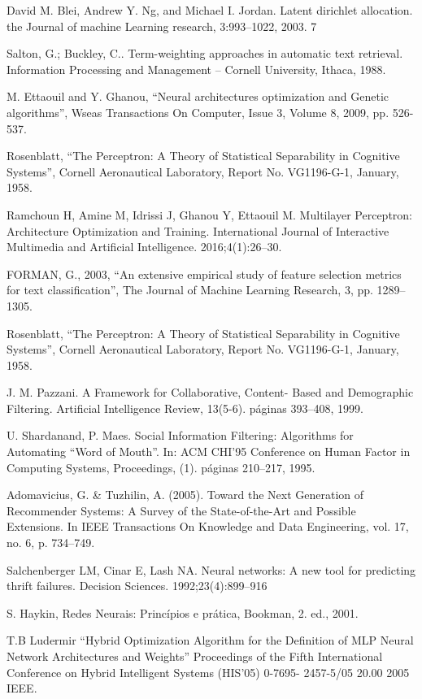 \documentclass[conference]{IEEEtran}
\begin{document}
\begin{thebibliography}
 David M. Blei, Andrew Y. Ng, and Michael I. Jordan. Latent dirichlet allocation.
the Journal of machine Learning research, 3:993–1022, 2003. 7

 Salton, G.; Buckley, C.. Term-weighting approaches in automatic text retrieval.
Information Processing and Management – Cornell University, Ithaca, 1988.

 M. Ettaouil and Y. Ghanou, “Neural architectures optimization and Genetic algorithms”, Wseas Transactions On Computer, Issue 3, Volume 8, 2009, pp. 526-537. 

 Rosenblatt, “The Perceptron: A Theory of Statistical Separability in Cognitive Systems”, Cornell Aeronautical Laboratory, Report No. VG1196-G-1, January, 1958. 

 Ramchoun H, Amine M, Idrissi J, Ghanou Y, Ettaouil M. Multilayer Perceptron: Architecture Optimization and Training. International Journal of Interactive Multimedia and Artificial Intelligence. 2016;4(1):26–30.

FORMAN, G., 2003, “An extensive empirical study of feature selection metrics for
text classification”, The Journal of Machine Learning Research, 3, pp. 1289–
1305.

 Rosenblatt, “The Perceptron: A Theory of Statistical Separability in Cognitive Systems”, Cornell Aeronautical Laboratory, Report No. VG1196-G-1, January, 1958. 

 J. M. Pazzani. A Framework for Collaborative, Content- Based and Demographic Filtering. Artificial Intelligence Review, 13(5-6). páginas 393–408, 1999.

 U. Shardanand, P. Maes. Social Information Filtering: Algorithms for Automating “Word of Mouth”. In: ACM CHI’95 Conference on Human Factor in Computing Systems, Proceedings, (1). páginas 210–217, 1995.

 Adomavicius, G. & Tuzhilin, A. (2005). Toward the Next Generation of Recommender
Systems: A Survey of the State-of-the-Art and Possible Extensions. In IEEE
Transactions On Knowledge and Data Engineering, vol. 17, no. 6, p. 734–749.


 Salchenberger LM, Cinar E, Lash NA. Neural networks: A new tool for predicting thrift failures. Decision Sciences. 1992;23(4):899–916

 S. Haykin, Redes Neurais: Princípios e prática, Bookman, 2. ed., 2001.

 T.B Ludermir “Hybrid Optimization Algorithm for the Definition of MLP Neural Network Architectures and Weights” Proceedings of the Fifth International Conference on Hybrid Intelligent Systems (HIS’05) 0-7695- 2457-5/05 20.00 2005 IEEE.





\end{thebibliography}
\end{document}
